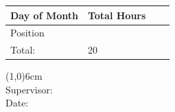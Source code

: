 \documentclass{article}
\begin{document}
\vspace{1mm}
\begin{table}[htbp]
\begin{tabular}{ | C{2cm} | C{1cm} |  L{13.5cm} | N}
\hline
Day of Month & Total Hours & & \\[10pt] \hline
Position & & \\[10pt] \hline


  
Total: & 20 & \\[10pt] \hline

\end{tabular}
\label{tab:table}
\end{table}

\vspace{2.5cm}
\noindent \line(1,0){6cm} \\
Supervisor: \\
Date:
\end{document}
